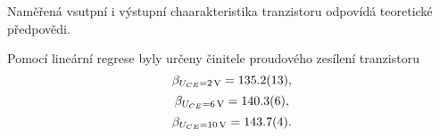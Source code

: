 \documentclass[0-protokol.tex]{subfiles}
\begin{document}
Naměřená vsutpní i výstupní chaarakteristika tranzistoru odpovídá teoretické předpovědi. 

Pomocí lineární regrese byly určeny činitele proudového zesílení tranzistoru 
$$ \beta_{U_{CE} = \SI{2}{V}} = \SI{135.2 \pm 1.3}{}, $$
$$ \beta_{U_{CE} = \SI{6}{V}} = \SI{140.3 \pm 0.6}{}, $$
$$ \beta_{U_{CE} = \SI{10}{V}} = \SI{143.7 \pm 0.4}{}. $$
\end{document}
